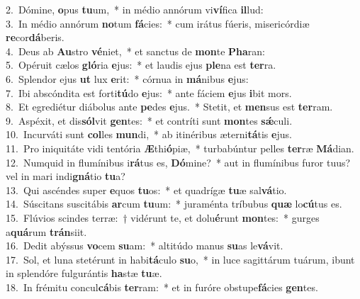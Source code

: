 {2.~}Dómine, \textbf{o}pus \textbf{tu}um,~* in médio annórum vi\textbf{ví}fica \textbf{il}lud:\\
{3.~}In médio annórum \textbf{no}tum \textbf{fá}cies:~* cum irátus fúeris, misericórdiæ \textbf{re}cor\textbf{dá}beris.\\
{4.~}Deus ab \textbf{Au}stro \textbf{vé}niet,~* et sanctus de \textbf{mon}te \textbf{Pha}ran:\\
{5.~}Opéruit cælos \textbf{gló}ria \textbf{e}jus:~* et laudis ejus \textbf{ple}na est \textbf{ter}ra.\\
{6.~}Splendor ejus \textbf{ut} lux \textbf{e}rit:~* córnua in \textbf{má}nibus \textbf{e}jus:\\
{7.~}Ibi abscóndita est forti\textbf{tú}do \textbf{e}jus:~* ante fáciem \textbf{e}jus \textbf{i}bit mors.\\
{8.~}Et egrediétur diábolus ante \textbf{pe}des \textbf{e}jus.~* Stetit, et \textbf{men}sus est \textbf{ter}ram.\\
{9.~}Aspéxit, et dis\textbf{sól}vit \textbf{gen}tes:~* et contríti sunt \textbf{mon}tes \textbf{sǽ}culi.\\
{10.~}Incurváti sunt \textbf{col}les \textbf{mun}di,~* ab itinéribus æterni\textbf{tá}tis \textbf{e}jus.\\
{11.~}Pro iniquitáte vidi tentória \textbf{Æ}thi\textbf{ó}piæ,~* turbabúntur pelles \textbf{ter}ræ \textbf{Má}dian.\\
{12.~}Numquid in flumínibus i\textbf{rá}tus es, \textbf{Dó}mine?~* aut in flumínibus furor tuus? vel in mari indi\textbf{gná}tio \textbf{tu}a?\\
{13.~}Qui ascéndes super \textbf{e}quos \textbf{tu}os:~* et quadrígæ \textbf{tu}æ sal\textbf{vá}tio.\\
{14.~}Súscitans suscitábis \textbf{ar}cum \textbf{tu}um:~* juraménta tríbubus \textbf{quæ} lo\textbf{cú}tus es.\\
{15.~}Flúvios scindes terræ:~† vidérunt te, et dolu\textbf{é}runt \textbf{mon}tes:~* gurges a\textbf{quá}rum \textbf{trán}siit.\\
{16.~}Dedit abýssus \textbf{vo}cem \textbf{su}am:~* altitúdo manus \textbf{su}as le\textbf{vá}vit.\\
{17.~}Sol, et luna stetérunt in habi\textbf{tá}culo \textbf{su}o,~* in luce sagittárum tuárum, ibunt in splendóre fulgurántis \textbf{ha}stæ \textbf{tu}æ.\\
{18.~}In frémitu concul\textbf{cá}bis \textbf{ter}ram:~* et in furóre obstupe\textbf{fá}cies \textbf{gen}tes.\\
